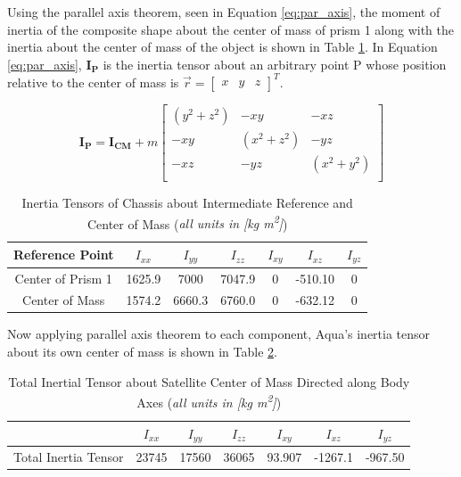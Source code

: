 Using the parallel axis theorem, seen in Equation \ref{eq:par_axis}, the moment of inertia of the composite shape about the center of mass of prism 1 along with the inertia about the center of mass of the object is shown in Table \ref{tab:chass_inertia}. In Equation \ref{eq:par_axis}, $\boldsymbol{I_P}$ is the inertia tensor about an arbitrary point P whose position relative to the center of mass is $\vec{r} = \begin{bmatrix} x & y & z \end{bmatrix}^T$.

\begin{equation} \label{eq:par_axis}
    \boldsymbol{I_{P}} = \boldsymbol{I_{CM}} + m \left[ \begin{array}{ccc}  (y^2 + z^2) & -  xy & -  xz \\ 
    -  xy &   (x^2 + z^2) & -  yz \\
-  xz & -  yz &  (x^2 + y^2) \\ \end{array} \right]
\end{equation}


\begin{table}[H]
    \centering
    \begin{tabular}{c|cccccc}
    Reference Point   & $I_{xx}$ & $I_{yy}$ & $I_{zz}$ & $I_{xy}$ & $I_{xz}$ & $I_{yz}$ \\ \hline
    Center of Prism 1 & 1625.9   & 7000     & 7047.9   & 0        & -510.10  & 0        \\
    Center of Mass    & 1574.2   & 6660.3   & 6760.0   & 0        & -632.12  & 0       
    \end{tabular}
    \caption{Inertia Tensors of Chassis about Intermediate Reference and Center of Mass (\emph{all units in [kg m\textsuperscript{2}]})}
    \label{tab:chass_inertia}
\end{table}

Now applying parallel axis theorem to each component, Aqua's inertia tensor about its own center of mass is shown in Table \ref{tab:total_ineretia}.

\begin{table}[H]
\centering
\begin{tabular}{c|cccccc}
                     & $I_{xx}$ & $I_{yy}$ & $I_{zz}$ & $I_{xy}$ & $I_{xz}$ & $I_{yz}$ \\ \hline
Total Inertia Tensor & 23745    & 17560    & 36065    & 93.907   & -1267.1  & -967.50 
\end{tabular}
\caption{Total Inertial Tensor about Satellite Center of Mass Directed along Body Axes (\emph{all units in [kg m\textsuperscript{2}]})}
\label{tab:total_ineretia}
\end{table}

